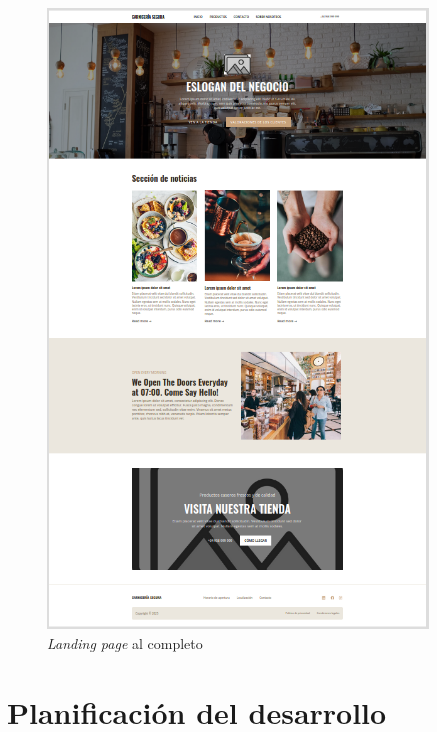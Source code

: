 \documentclass[a4paper]{article}
\begin{document}
\begin{figure}[H]
    \centering
    \includegraphics[width=0.9\textwidth]{images/mockup-landing-page.png}
    \captionsetup{width=0.9\textwidth}
    \caption{\textit{Landing page} al completo}
\end{figure}



\section{Planificación del desarrollo}
\end{document}
